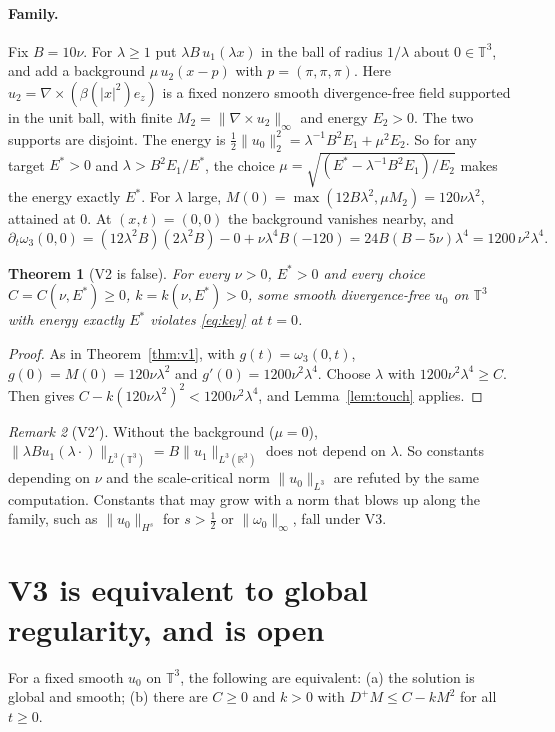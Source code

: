 \documentclass[11pt]{article}
\newcommand{\T}{\mathbb{T}^3}
\newcommand{\R}{\mathbb{R}}
\newtheorem{theorem}{Theorem}
\theoremstyle{remark}
\newtheorem{remark}[theorem]{Remark}
\newcommand{\lean}[1]{\path{#1}}
\begin{document}
\paragraph{Family.} Fix $B=10\nu$. For $\lambda\ge1$ put $\lambda B\,u_1(\lambda x)$ in the ball of radius $1/\lambda$ about
$0\in\T$, and add a background $\mu\,u_2(x-p)$ with $p=(\pi,\pi,\pi)$. Here $u_2=\nabla\times(\beta(|x|^2)e_z)$ is a fixed nonzero
smooth divergence-free field supported in the unit ball, with finite $M_2=\|\nabla\times u_2\|_\infty$ and energy $E_2>0$. The two supports are disjoint. The energy is
$\tfrac12\|u_0\|_2^2=\lambda^{-1}B^2E_1+\mu^2E_2$. So for any target $E^*>0$ and $\lambda>B^2E_1/E^*$,
the choice $\mu=\sqrt{(E^*-\lambda^{-1}B^2E_1)/E_2}$ makes the energy exactly $E^*$. For $\lambda$ large,
$M(0)=\max(12B\lambda^2,\mu M_2)=120\nu\lambda^2$, attained at $0$. At $(x,t)=(0,0)$ the background vanishes nearby, and
\[
\partial_t\omega_3(0,0)=(12\lambda^2B)(2\lambda^2B)-0+\nu\lambda^4B(-120)=24B(B-5\nu)\lambda^4=1200\,\nu^2\lambda^4 .
\]

\begin{theorem}[V2 is false]\label{thm:v2}
For every $\nu>0$, $E^*>0$ and every choice $C=C(\nu,E^*)\ge0$, $k=k(\nu,E^*)>0$, some smooth divergence-free $u_0$ on $\T$
with energy exactly $E^*$ violates \eqref{eq:key} at $t=0$.
\end{theorem}
\begin{proof}
As in Theorem~\ref{thm:v1}, with $g(t)=\omega_3(0,t)$, $g(0)=M(0)=120\nu\lambda^2$ and $g'(0)=1200\nu^2\lambda^4$.
Choose $\lambda$ with $1200\nu^2\lambda^4\ge C$. Then \lean{localized_family_violation} gives
$C-k(120\nu\lambda^2)^2<1200\nu^2\lambda^4$, and Lemma~\ref{lem:touch} applies.
\end{proof}

\begin{remark}[V2$'$]\label{rem:l3}
Without the background ($\mu=0$), $\|\lambda Bu_1(\lambda\cdot)\|_{L^3(\T)}=B\|u_1\|_{L^3(\R^3)}$ does not depend on $\lambda$.
So constants depending on $\nu$ and the scale-critical norm $\|u_0\|_{L^3}$ are refuted by the same computation. Constants
that may grow with a norm that blows up along the family, such as $\|u_0\|_{H^s}$ for $s>\tfrac12$ or $\|\omega_0\|_\infty$,
fall under V3.
\end{remark}

\section{V3 is equivalent to global regularity, and is open}
For a fixed smooth $u_0$ on $\T$, the following are equivalent: (a) the solution is global and smooth; (b) there are
$C\ge0$ and $k>0$ with $D^+M\le C-kM^2$ for all $t\ge0$.
\end{document}

